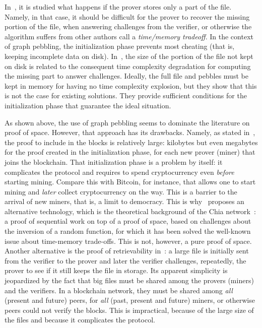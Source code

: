In~\cite{Reyzin23}, it is studied what happens if the prover stores only a part of the file.
Namely, in that case, it should be difficult for the prover to recover the
missing portion of the file, when answering challenges from the verifier, or otherwise
the algorithm suffers from other authors call a \emph{time/memory tradeoff}.
In the context of graph pebbling, the initialization phase prevents most cheating
(that is, keeping incomplete data on disk). In~\cite{Reyzin23}, the size
of the portion of the file not kept on disk is related to the consequent time
complexity degradation for computing the missing part to answer challenges.
Ideally, the full file and pebbles must be kept in memory
for having no time complexity explosion, but they show that this is not the case for existing solutions.
They provide sufficient conditions for the initialization phase that guarantee the ideal situation.

As shown above, the use of graph pebbling seems to dominate the literature on proof of space.
However, that approach has its drawbacks.
Namely, as stated in~\cite{AbusalahACKPR17}, the proof to include in the blocks is relatively large:
kilobytes but even megabytes for the proof created in the initialization phase, for each new
prover (miner) that joins the blockchain. That initialization phase is a problem by itself: it complicates
the protocol and requires to spend cryptocurrency even \emph{before}
starting mining. Compare this with Bitcoin, for instance, that allows one to start mining
and \emph{later} collect cryptocurrency on the way. This is a barrier to the arrival of new
miners, that is, a limit to democracy.
This is why~\cite{AbusalahACKPR17} proposes an alternative technology, which is the
theoretical background of the Chia network~\cite{CohenP19,Chia}:
a proof of sequential work on top of a proof of space, based on challenges
about the inversion of a random function, for which it has been solved
the well-known issue about time-memory trade-offs. This is not, however, a pure proof of space.
Another alternative is the proof of retrievability in~\cite{JuelsK07}: a large file
is initially sent from the verifier to the prover and later the verifier
challenges, repeatedly, the prover to see if it still keeps the file in storage.
Its apparent simplicity
is jeopardized by the fact that big files must be shared among the provers (miners) and
the verifiers. In a blockchain network, they must be shared among \emph{all} (present and future)
peers, for \emph{all} (past, present and future) miners, or otherwise peers could not verify the blocks.
This is impractical, because of the large size of the files and because it complicates the protocol.

